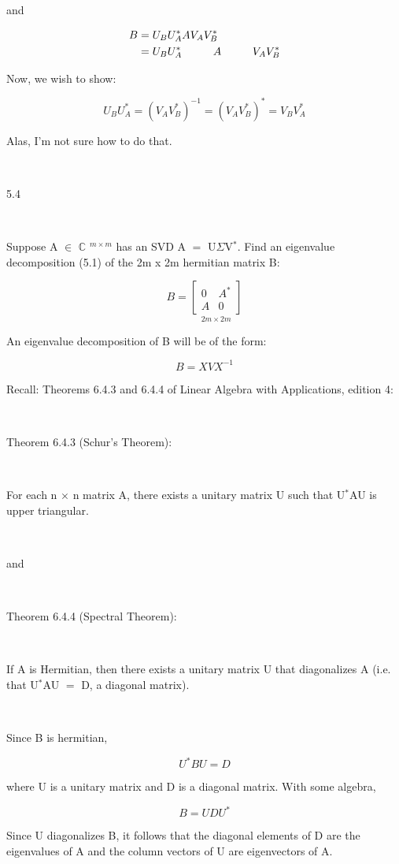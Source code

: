 \documentclass[12pt]{article}
\newcommand{\mt}[1]{\ensuremath{#1}}
\newcommand{\bc}{\mt{\mathbb{C}} }       %
\newcommand{\mem}{\mt{\in} }
\newcommand{\eql}{\mt{=} }
\newcommand{\uf}[2]{#1\mt{^{#2}}}
\newcommand{\splt}[1]{\begin{split}#1\end{split}}
\newcommand\tab[1][1cm]{\hspace*{#1}}
\begin{document}
and

\begin{displaymath}
\splt{
B & = U_B U^*_A A V_A V^*_B \\
 & = U_B U^*_A \tab A \tab V_A V^*_B
}
\end{displaymath}

Now, we wish to show:

\begin{displaymath}
  U_B U^*_A = (V_A V^*_B)^{-1} = (V_A V^*_B)^* = V_B V_A^*
\end{displaymath}

Alas, I'm not sure how to do that.

\

5.4

\

Suppose A \mem \uf{\bc}{m \times m} has an SVD A \eql U$\Sigma$\uf{V}{*}. Find an eigenvalue decomposition (5.1) of the 2m x 2m hermitian matrix B:

\begin{displaymath}
  B = \underset{2m \times 2m}{
\begin{bmatrix}
   0 & A^* \\
   A & 0 
  \end{bmatrix}
}
\end{displaymath}

An eigenvalue decomposition of B will be of the form:

\begin{displaymath}
  B = XVX^{-1}
\end{displaymath}

Recall: Theorems 6.4.3 and 6.4.4 of Linear Algebra with Applications, edition 4:

\

Theorem 6.4.3 (Schur's Theorem):

\

For each n $\times$ n matrix A, there exists a unitary matrix U such that \uf{U}{*}AU is upper triangular.

\

and

\

Theorem 6.4.4 (Spectral Theorem):

\

If A is Hermitian, then there exists a unitary matrix U that diagonalizes A (i.e. that \uf{U}{*}AU \eql D, a diagonal matrix).

\

Since B is hermitian,

\begin{displaymath}
  U^* B U \eql D
\end{displaymath}

where U is a unitary matrix and D is a diagonal matrix. With some algebra,

\begin{displaymath}
  B \eql U D U^*
\end{displaymath}

Since U diagonalizes B, it follows that the diagonal elements of D are the eigenvalues of A and the column vectors of U are eigenvectors of A.
\end{document}
